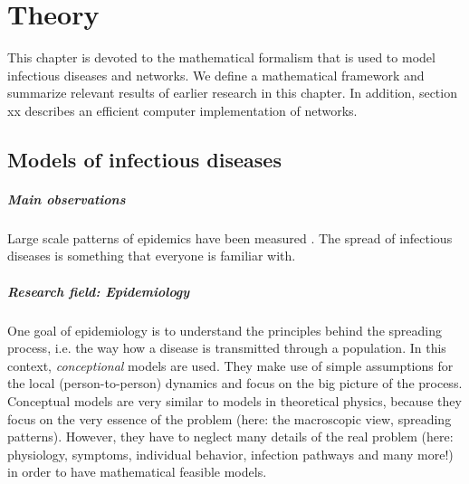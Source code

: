 %
%
%
%
%
%
%
%


\chapter{Theory}\label{sec:theory}
This chapter is devoted to the mathematical formalism that is used to model infectious diseases and networks.
We define a mathematical framework and summarize relevant results of earlier research in this chapter.
In addition, section xx describes an efficient computer implementation of networks.

\section{Models of infectious diseases}
\paragraph{Main observations\color{Cayenne}{.}} Large scale patterns of epidemics have been measured \citep{giehl:2012}.
The spread of infectious diseases is something that everyone is familiar with.

\paragraph{Research field: Epidemiology\color{Cayenne}{.}} One goal of epidemiology is to understand the principles behind the spreading process, i.e. the way how a disease is transmitted through a population.
In this context, \emph{conceptional} models are used.
They make use of simple assumptions for the local (person-to-person) dynamics and focus on the big picture of the process.
Conceptual models are very similar to models in theoretical physics, because they focus on the very essence of the problem (here: the macroscopic view, spreading patterns).
However, they have to neglect many details of the real problem (here: physiology, symptoms, individual behavior, infection pathways and many more!) in order to have mathematical feasible models.

